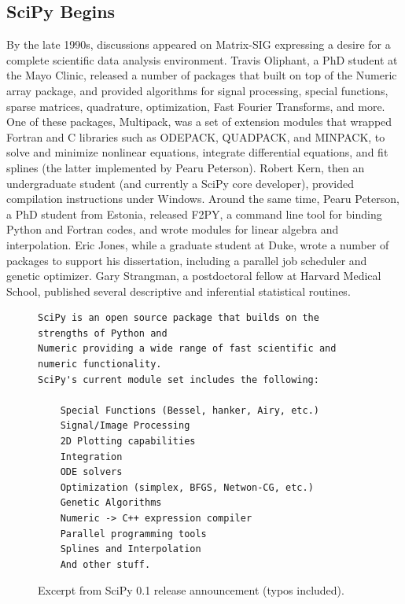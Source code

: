 \documentclass[fleqn,10pt]{wlscirep}
\begin{document}
\subsection*{SciPy Begins}

By the late 1990s, discussions appeared on Matrix-SIG
expressing a desire for a complete scientific data analysis environment\cite{Travis-Keynote-2010}.
Travis Oliphant, a PhD student at the Mayo Clinic,
released a number of packages\cite{Travis-some-modules,Travis-enhance} 
that built on top of the Numeric array
package, and provided algorithms for signal processing, special
functions, sparse matrices, quadrature, optimization, Fast Fourier
Transforms, and more.  One of these packages, Multipack, was a set of
extension modules that wrapped Fortran and C libraries such as
ODEPACK, QUADPACK, and MINPACK, to solve and minimize nonlinear
equations, integrate differential equations, and fit splines (the
latter implemented by Pearu Peterson).  Robert Kern, then an
undergraduate student (and currently a SciPy core developer), provided
compilation instructions under Windows.
Around the same time, Pearu Peterson, a PhD student from Estonia,
released F2PY\cite{peterson2009f2py}, a command line tool for binding Python and Fortran
codes, and wrote modules for linear algebra and interpolation.
Eric Jones, while a graduate student at Duke, wrote a number of
packages to support his dissertation, including a parallel job
scheduler and genetic optimizer.
%
%
Gary Strangman, a postdoctoral fellow at Harvard Medical School,
published several descriptive and inferential statistical 
routines\cite{Strangman-modules}.

\begin{figure}
\begin{verbatim}
SciPy is an open source package that builds on the strengths of Python and
Numeric providing a wide range of fast scientific and numeric functionality.
SciPy's current module set includes the following:

    Special Functions (Bessel, hanker, Airy, etc.)
    Signal/Image Processing
    2D Plotting capabilities
    Integration
    ODE solvers
    Optimization (simplex, BFGS, Netwon-CG, etc.)
    Genetic Algorithms
    Numeric -> C++ expression compiler
    Parallel programming tools
    Splines and Interpolation
    And other stuff.
\end{verbatim}
\caption{Excerpt from SciPy 0.1 release announcement (typos included).}\label{fig:announce-0.1}
\end{figure}
\end{document}
